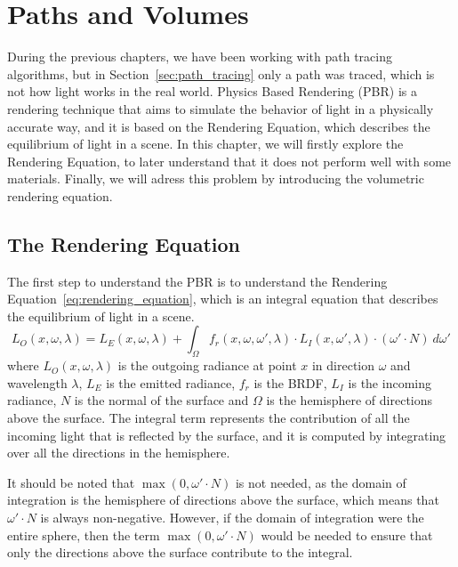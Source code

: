 \chapter{Paths and Volumes}

During the previous chapters, we have been working with path tracing algorithms, but in Section~\ref{sec:path_tracing} only a path was traced, which is not how light works in the real world. Physics Based Rendering (PBR) is a rendering technique that aims to simulate the behavior of light in a physically accurate way, and it is based on the Rendering Equation, which describes the equilibrium of light in a scene. In this chapter, we will firstly explore the Rendering Equation, to later understand that it does not perform well with some materials. Finally, we will adress this problem by introducing the volumetric rendering equation.

\section{The Rendering Equation}

The first step to understand the PBR is to understand the Rendering Equation~\eqref{eq:rendering_equation}, which is an integral equation that describes the equilibrium of light in a scene.
\begin{equation}
L_O(x, \omega, \lambda) = L_E(x, \omega, \lambda) + \int_{\Omega} f_r(x, \omega, \omega', \lambda) \cdot L_I(x, \omega', \lambda) \cdot (\omega' \cdot N) \ d\omega'
\label{eq:rendering_equation}
\end{equation}
where $L_O(x, \omega, \lambda)$ is the outgoing radiance at point $x$ in direction $\omega$ and wavelength $\lambda$, $L_E$ is the emitted radiance, $f_r$ is the BRDF, $L_I$ is the incoming radiance, $N$ is the normal of the surface and $\Omega$ is the hemisphere of directions above the surface. The integral term represents the contribution of all the incoming light that is reflected by the surface, and it is computed by integrating over all the directions in the hemisphere.
\begin{observacion}
    It should be noted that $\max(0,\omega'\cdot N)$ is not needed, as the domain of integration is the hemisphere of directions above the surface, which means that $\omega'\cdot N$ is always non-negative. However, if the domain of integration were the entire sphere, then the term $\max(0,\omega'\cdot N)$ would be needed to ensure that only the directions above the surface contribute to the integral.
\end{observacion}

